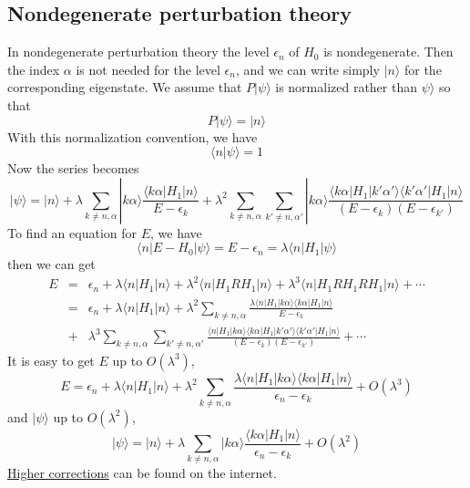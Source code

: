 \subsection{Nondegenerate perturbation theory}
In nondegenerate perturbation theory the level $\epsilon_n$ of $H_0$ is nondegenerate. Then the index $\alpha$ is not needed for the level $\epsilon_n$, and we can write simply $|n\rangle$ for the corresponding eigenstate. We assume that $P|\psi\rangle$ is normalized rather than $\psi\rangle$ so that
\[P|\psi\rangle  = |n\rangle\]
With this normalization convention, we have
\[\langle n | \psi \rangle = 1\]
Now the series becomes
\[|\psi\rangle = |n\rangle + \lambda \sum_{k\neq n,\alpha} |k\alpha\rangle \frac{\langle k\alpha | H_1 | n \rangle}{E-\epsilon_k} + \lambda^2 \sum_{k\neq n,\alpha} \sum_{k'\neq n,\alpha'} |k\alpha\rangle \frac{\langle k\alpha | H_1 | k'\alpha' \rangle \langle k'\alpha' | H_1 | n \rangle}{(E-\epsilon_k)(E-\epsilon_{k'})}\]
To find an equation for $E$, we have
\[\langle n | E-H_0 | \psi\rangle = E-\epsilon_n = \lambda \langle n | H_1 | \psi\rangle\]
then we can get
\begin{eqnarray}
E &=& \epsilon_n + \lambda \langle n | H_1 | n\rangle + \lambda^2 \langle n | H_1RH_1 | n\rangle + \lambda^3 \langle n | H_1RH_1RH_1 | n\rangle + \cdots \nonumber \\
&=& \epsilon_n 
+ \lambda \langle n | H_1|n\rangle 
+ \lambda^2 \sum_{k\neq n,\alpha}  \frac{\lambda \langle n | H_1|k\alpha\rangle \langle k\alpha | H_1 | n \rangle}{E-\epsilon_k} \nonumber \\
&+& \lambda^3 \sum_{k\neq n,\alpha} \sum_{k'\neq n,\alpha'} \frac{\langle n | H_1 |k\alpha\rangle \langle k\alpha | H_1 | k'\alpha' \rangle \langle k'\alpha' | H_1 | n \rangle}{(E-\epsilon_k)(E-\epsilon_{k'})} + \cdots \nonumber
\end{eqnarray}
It is easy to get $E$ up to $O(\lambda^3)$,
\[E = \epsilon_n  + \lambda \langle n | H_1|n\rangle  + \lambda^2 \sum_{k\neq n,\alpha}  \frac{\lambda \langle n | H_1|k\alpha\rangle \langle k\alpha | H_1 | n \rangle}{\epsilon_n-\epsilon_k} + O(\lambda^3)\]
and $|\psi\rangle$ up to $O(\lambda^2)$,
\[|\psi\rangle = |n\rangle + \lambda \sum_{k\neq n,\alpha} |k\alpha\rangle \frac{\langle k\alpha | H_1 | n \rangle}{\epsilon_n-\epsilon_k} + O(\lambda^2)\]
\href{https://en.wikipedia.org/wiki/Perturbation_theory_(quantum_mechanics)#Second-order_and_higher_corrections}{Higher corrections} can be found on the internet.

